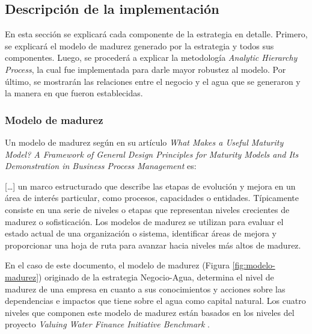 \subsection{Descripción de la implementación} \label{subsec:descripcion-implementacion}

En esta sección se explicará cada componente de la estrategia en detalle. Primero, se explicará el modelo de madurez generado por la estrategia y todos sus componentes. Luego, se procederá a explicar la metodología \textit{Analytic Hierarchy Process}, la cual fue implementada para darle mayor robustez al modelo. Por último, se mostrarán las relaciones entre el negocio y el agua que se generaron y la manera en que fueron establecidas.

\subsubsection{Modelo de madurez}
Un modelo de madurez según \textcite{poppelbu-2011} en su artículo \textit{What Makes a Useful Maturity Model? A Framework of General Design Principles for Maturity Models and Its Demonstration in Business Process Management} es:

\hfill
\par
\leftskip=0.35in \rightskip=0.35in
[…] un marco estructurado que describe las etapas de evolución y mejora en un área de interés particular, como procesos, capacidades o entidades. Típicamente consiste en una serie de niveles o etapas que representan niveles crecientes de madurez o sofisticación. Los modelos de madurez se utilizan para evaluar el estado actual de una organización o sistema, identificar áreas de mejora y proporcionar una hoja de ruta para avanzar hacia niveles más altos de madurez.

\hfill
\par
\leftskip=0in \rightskip=0in

En el caso de este documento, el modelo de madurez (Figura \ref{fig:modelo-madurez}) originado de la estrategia Negocio-Agua, determina el nivel de madurez de una empresa en cuanto a sus conocimientos y acciones sobre las dependencias e impactos que tiene sobre el agua como capital natural. Los cuatro niveles que componen este modelo de madurez están basados en los niveles del proyecto \textit{Valuing Water Finance Initiative Benchmark} \parencite{ceres-2023B}.

